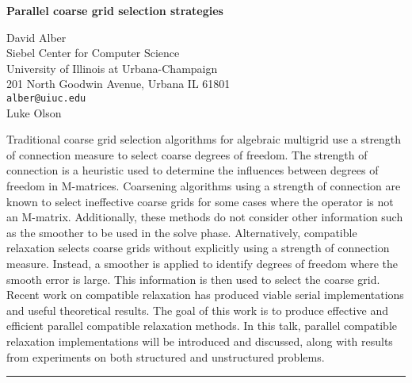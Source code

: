 \documentclass[twosided]{report}
\begin{document}
\begin{center}
{\large			%
{\bf Parallel coarse grid selection strategies}}

	David Alber \\
	Siebel Center for Computer Science \\
	University of Illinois at Urbana-Champaign \\
	201 North Goodwin Avenue, Urbana IL 61801 \\
	{\tt alber@uiuc.edu} \\
	Luke Olson
\end{center}
Traditional coarse grid selection algorithms for algebraic
multigrid use a strength of connection measure to select
coarse degrees of freedom. The strength of connection is a
heuristic used to determine the influences between degrees
of freedom in M-matrices. Coarsening algorithms using a
strength of connection are known to select ineffective
coarse grids for some cases where the operator is not an
M-matrix. Additionally, these methods do not consider other
information such as the smoother to be used in the solve
phase. Alternatively, compatible relaxation selects coarse
grids without explicitly using a strength of connection
measure. Instead, a smoother is applied to identify degrees
of freedom where the smooth error is large. This information
is then used to select the coarse grid. Recent work on
compatible relaxation has produced viable serial
implementations and useful theoretical results. The goal of
this work is to produce effective and efficient parallel
compatible relaxation methods. In this talk, parallel
compatible relaxation implementations will be introduced and
discussed, along with results from experiments on both
structured and unstructured problems.



	\begin{center} \rule{6in}{1pt} \end{center}
\end{document}

